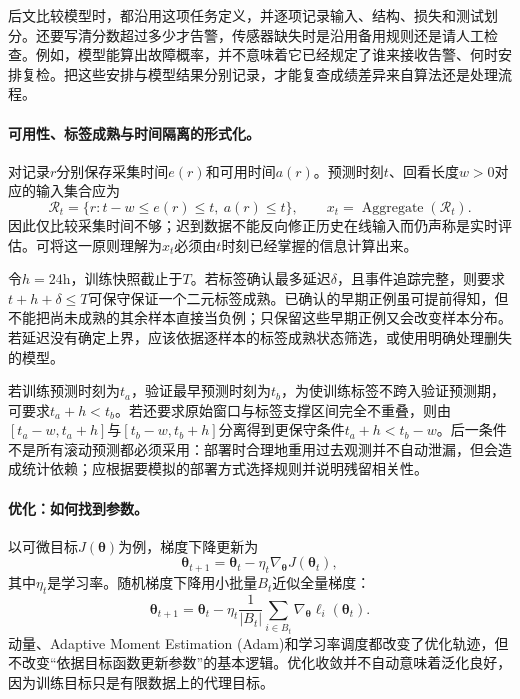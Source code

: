 后文比较模型时，都沿用这项任务定义，并逐项记录输入、结构、损失和测试划分。还要写清分数超过多少才告警，传感器缺失时是沿用备用规则还是请人工检查。例如，模型能算出故障概率，并不意味着它已经规定了谁来接收告警、何时安排复检。把这些安排与模型结果分别记录，才能复查成绩差异来自算法还是处理流程。

\paragraph{可用性、标签成熟与时间隔离的形式化。}
对记录$r$分别保存采集时间$e(r)$和可用时间$a(r)$。预测时刻$t$、回看长度$w>0$对应的输入集合应为
\begin{equation}
 \mathcal R_t=\{r:t-w\leq e(r)\leq t,\ a(r)\leq t\},\qquad
 x_t=\operatorname{Aggregate}(\mathcal R_t).
\end{equation}
因此仅比较采集时间不够；迟到数据不能反向修正历史在线输入而仍声称是实时评估。可将这一原则理解为$x_t$必须由$t$时刻已经掌握的信息计算出来。

令$h=24\mathrm h$，训练快照截止于$T$。若标签确认最多延迟$\delta$，且事件追踪完整，则要求$t+h+\delta\leq T$可保守保证一个二元标签成熟。已确认的早期正例虽可提前得知，但不能把尚未成熟的其余样本直接当负例；只保留这些早期正例又会改变样本分布。若延迟没有确定上界，应该依据逐样本的标签成熟状态筛选，或使用明确处理删失的模型。

若训练预测时刻为$t_a$，验证最早预测时刻为$t_b$，为使训练标签不跨入验证预测期，可要求$t_a+h<t_b$。若还要求原始窗口与标签支撑区间完全不重叠，则由$[t_a-w,t_a+h]$与$[t_b-w,t_b+h]$分离得到更保守条件$t_a+h<t_b-w$。后一条件不是所有滚动预测都必须采用：部署时合理地重用过去观测并不自动泄漏，但会造成统计依赖；应根据要模拟的部署方式选择规则并说明残留相关性。

\paragraph{优化：如何找到参数。}
以可微目标$J(\bm{\theta})$为例，梯度下降更新为
\begin{equation}
 \bm{\theta}_{t+1}=\bm{\theta}_t-\eta_t\nabla_{\bm{\theta}}J(\bm{\theta}_t),
\end{equation}
其中$\eta_t$是学习率。随机梯度下降用小批量$B_t$近似全量梯度：
\begin{equation}
 \bm{\theta}_{t+1}=\bm{\theta}_t-\eta_t\frac{1}{|B_t|}\sum_{i\in B_t}\nabla_{\bm{\theta}}\ell_i(\bm{\theta}_t).
\end{equation}
动量、Adaptive Moment Estimation (Adam)和学习率调度都改变了优化轨迹，但不改变“依据目标函数更新参数”的基本逻辑。优化收敛并不自动意味着泛化良好，因为训练目标只是有限数据上的代理目标。

